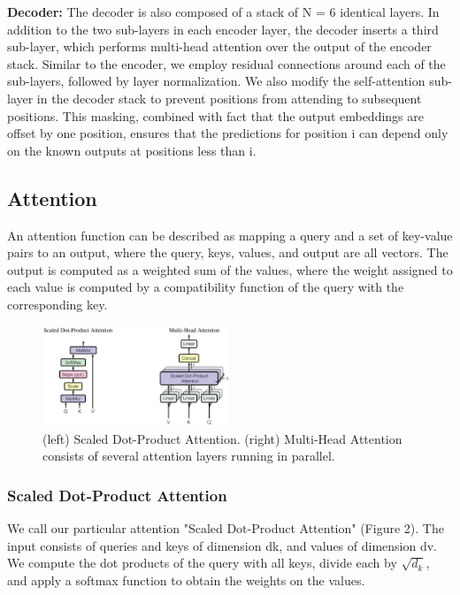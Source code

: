 \documentclass{article}
\begin{document}
\setlength{\parskip}{1em}
\noindent
\textbf{Decoder:} The decoder is also composed of a stack of N = 6 identical layers. In addition to the two
sub-layers in each encoder layer, the decoder inserts a third sub-layer, which performs multi-head
attention over the output of the encoder stack. Similar to the encoder, we employ residual connections
around each of the sub-layers, followed by layer normalization. We also modify the self-attention
sub-layer in the decoder stack to prevent positions from attending to subsequent positions. This
masking, combined with fact that the output embeddings are offset by one position, ensures that the
predictions for position i can depend only on the known outputs at positions less than i.


\subsection{Attention}
An attention function can be described as mapping a query and a set of key-value pairs to an output,
where the query, keys, values, and output are all vectors. The output is computed as a weighted sum
of the values, where the weight assigned to each value is computed by a compatibility function of the
query with the corresponding key.

\begin{figure}[htb]
    \centering
    \includegraphics[width=0.5\textwidth]{figures/fig2.PNG}
    \caption{(left) Scaled Dot-Product Attention. (right) Multi-Head Attention consists of several
    attention layers running in parallel.}
    \label{fig:attention}
\end{figure}

\subsubsection{Scaled Dot-Product Attention}
We call our particular attention "Scaled Dot-Product Attention" (Figure 2). The input consists of
queries and keys of dimension dk, and values of dimension dv. We compute the dot products of the
query with all keys, divide each by $\sqrt{d_k}$, and apply a softmax function to obtain the weights on the
values.  
\end{document}
